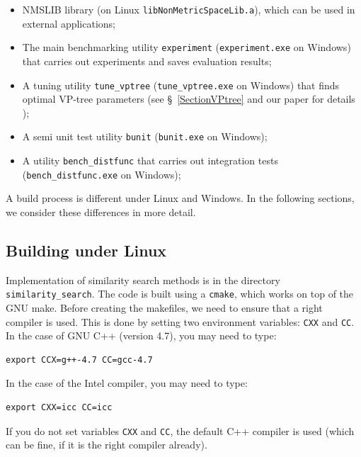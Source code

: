 \documentclass[runningheads,a4paper]{llncs}
\newcommand{\ttt}[1]{\texttt{#1}}
\begin{document}
{\begin{itemize}
\item NMSLIB library (on Linux \ttt{libNonMetricSpaceLib.a}),
which can be used in external applications;
\item The main benchmarking utility \ttt{experiment} (\ttt{experiment.exe} on Windows) 
that carries out experiments and saves evaluation results;
\item A tuning utility \ttt{tune\_vptree} (\ttt{tune\_vptree.exe} on Windows) 
that finds optimal VP-tree parameters (see \S~\ref{SectionVPtree} and our paper for details \cite{Boytsov_and_Bilegsaikhan:nips2013});
\item A semi unit test utility \ttt{bunit} (\ttt{bunit.exe} on Windows);
\item A utility \ttt{bench\_distfunc} that carries out integration tests (\ttt{bench\_distfunc.exe} on  Windows);
\end{itemize}

A build process is different under Linux and Windows. 
In  the following sections, we consider these differences in more detail. 

\subsection{Building under Linux}\label{SectionBuildLinux}
Implementation of similarity search methods is in the directory \ttt{similarity\_search}.
The code is built using a \ttt{cmake}, which works on top of the GNU make.
Before creating the makefiles, we need to ensure that a right compiler is used.
This is done by setting two environment variables: \ttt{CXX} and \ttt{CC}.
In the case of GNU C++ (version 4.7), you may need to type:
\begin{verbatim}
export CCX=g++-4.7 CC=gcc-4.7 
\end{verbatim}
In the case of the Intel compiler, you may need to type:
\begin{verbatim}
export CXX=icc CC=icc 
\end{verbatim}
If you do not set variables \ttt{CXX} and \ttt{CC}, 
the default C++ compiler is used (which can be fine, if it is the right compiler already).


}
\end{document}
